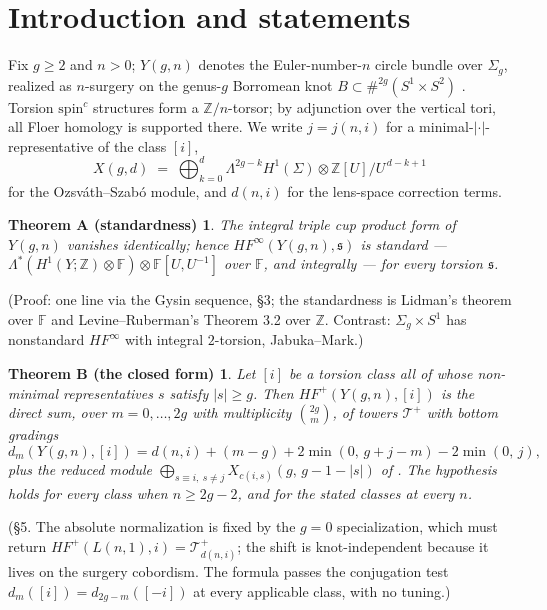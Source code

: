 \documentclass[11pt,reqno]{amsart}
\newcommand{\F}{\mathbb{F}}
\newcommand{\Z}{\mathbb{Z}}
\newcommand{\HFp}{\mathit{HF}^{+}}
\newcommand{\HFinf}{\mathit{HF}^{\infty}}
\newcommand{\Sig}{\Sigma}
\newcommand{\Lam}{\Lambda}
\newcommand{\spinc}{\mathfrak{s}}
\newcommand{\Ymg}{Y(g,n)}
\theoremstyle{plain}
\newtheorem*{thmA}{Theorem A (standardness)}
\newtheorem*{thmB}{Theorem B (the closed form)}
\begin{document}
\section{Introduction and statements}

Fix $g\ge 2$ and $n>0$; $\Ymg$ denotes the Euler-number-$n$ circle bundle over $\Sig_g$, realized as $n$-surgery on the genus-$g$ Borromean knot $B\subset \#^{2g}(S^1\times S^2)$ \cite[\S5]{OS08}. Torsion $\mathrm{spin}^c$ structures form a $\Z/n$-torsor; by adjunction over the vertical tori, all Floer homology is supported there. We write $j=j(n,i)$ for a minimal-$|\cdot|$-representative of the class $[i]$,
\[
 X(g,d) \;=\; \bigoplus_{k=0}^{d} \Lam^{2g-k}H^1(\Sig)\otimes \Z[U]/U^{\,d-k+1}
\]
for the Ozsv\'ath--Szab\'o module, and $d(n,i)$ for the lens-space correction terms.

\begin{thmA}
The integral triple cup product form of $\Ymg$ vanishes identically; hence $\HFinf(\Ymg,\spinc)$ is standard --- $\Lam^{*}(H^1(Y;\Z)\otimes\F)\otimes\F[U,U^{-1}]$ over $\F$, and integrally --- for every torsion $\spinc$.
\end{thmA}
\noindent(Proof: one line via the Gysin sequence, \S3; the standardness is Lidman's theorem over $\F$ and Levine--Ruberman's Theorem 3.2 over $\Z$. Contrast: $\Sig_g\times S^1$ has nonstandard $\HFinf$ with integral $2$-torsion, Jabuka--Mark.)

\begin{thmB}
Let $[i]$ be a torsion class all of whose non-minimal representatives $s$ satisfy $|s|\ge g$. Then $\HFp(\Ymg,[i])$ is the direct sum, over $m=0,\dots,2g$ with multiplicity $\binom{2g}{m}$, of towers $\mathcal T^{+}$ with bottom gradings
\[
 d_m(\Ymg,[i]) = d(n,i) + (m-g) + 2\min(0,\,g+j-m) - 2\min(0,\,j),
\]
plus the reduced module $\bigoplus_{s\equiv i,\ s\ne j} X_{c(i,s)}(g,\,g-1-|s|)$ of \cite[Thm~5.6]{OS08}. The hypothesis holds for every class when $n\ge 2g-2$, and for the stated classes at every $n$.
\end{thmB}
\noindent(\S5. The absolute normalization is fixed by the $g=0$ specialization, which must return $\HFp(L(n,1),i)=\mathcal T^{+}_{d(n,i)}$; the shift is knot-independent because it lives on the surgery cobordism. The formula passes the conjugation test $d_m([i])=d_{2g-m}([-i])$ at every applicable class, with no tuning.)
\end{document}

